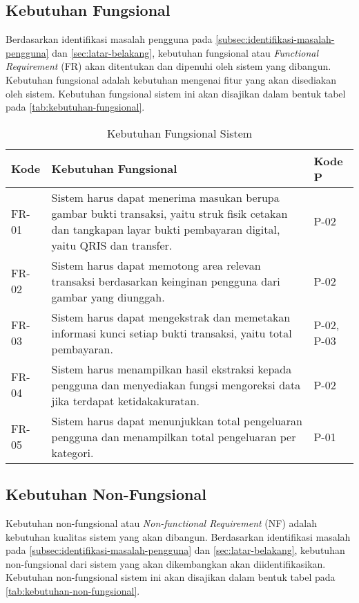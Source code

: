 \subsection{Kebutuhan Fungsional}
\label{subsec:kebutuhan-fungsional}
Berdasarkan identifikasi masalah pengguna pada \autoref{subsec:identifikasi-masalah-pengguna} dan \autoref{sec:latar-belakang}, kebutuhan fungsional atau \emph{Functional Requirement} (FR) akan ditentukan dan dipenuhi oleh sistem yang dibangun. Kebutuhan fungsional adalah kebutuhan mengenai fitur yang akan disediakan oleh sistem. Kebutuhan fungsional  sistem ini akan disajikan dalam bentuk tabel pada \autoref{tab:kebutuhan-fungsional}.

\begin{table}[h!]
\caption{Kebutuhan Fungsional Sistem}
\label{tab:kebutuhan-fungsional}
\begin{tabularx}{\linewidth}{|l|X|l|}
\hline
\textbf{Kode} & \textbf{Kebutuhan Fungsional} & \textbf{Kode P}\\
\hline
FR-01 & Sistem harus dapat menerima masukan berupa gambar bukti transaksi, yaitu struk fisik cetakan dan tangkapan layar bukti pembayaran digital, yaitu QRIS dan transfer. & P-02\\
\hline
FR-02 & Sistem harus dapat memotong area relevan transaksi berdasarkan keinginan pengguna dari gambar yang diunggah. & P-02\\
\hline
FR-03 & Sistem harus dapat mengekstrak dan memetakan informasi kunci setiap bukti transaksi, yaitu total pembayaran. & P-02, P-03\\
\hline
FR-04 & Sistem harus menampilkan hasil ekstraksi kepada pengguna dan menyediakan fungsi mengoreksi data jika terdapat ketidakakuratan. & P-02\\
\hline
FR-05 & Sistem harus dapat menunjukkan total pengeluaran pengguna dan menampilkan total pengeluaran per kategori. & P-01 \\
\hline
\end{tabularx}
\end{table}

\subsection{Kebutuhan Non-Fungsional}
\label{subsec:kebutuhan-non-fungsional}
Kebutuhan non-fungsional atau \emph{Non-functional Requirement} (NF) adalah kebutuhan kualitas sistem yang akan dibangun. Berdasarkan identifikasi masalah pada \autoref{subsec:identifikasi-masalah-pengguna} dan \autoref{sec:latar-belakang}, kebutuhan non-fungsional dari sistem yang akan dikembangkan akan diidentifikasikan. Kebutuhan non-fungsional sistem ini akan disajikan dalam bentuk tabel pada \autoref{tab:kebutuhan-non-fungsional}.

